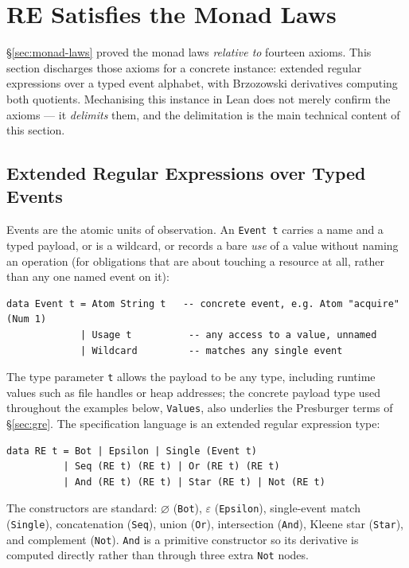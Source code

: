 \documentclass[acmsmall,screen]{acmart}
\begin{document}
\section{RE Satisfies the Monad Laws}
\label{sec:re-instance}

\S\ref{sec:monad-laws} proved the monad laws \emph{relative to} fourteen
axioms.
This section discharges those axioms for a concrete instance: extended
regular expressions over a typed event alphabet, with Brzozowski
derivatives computing both quotients.
Mechanising this instance in Lean does not merely confirm the axioms ---
it \emph{delimits} them, and the delimitation is the main technical content
of this section.

\subsection{Extended Regular Expressions over Typed Events}
\label{sec:re}

Events are the atomic units of observation.
An \lstinline{Event t} carries a name and a typed payload, or is a
wildcard, or records a bare \emph{use} of a value without naming an
operation (for obligations that are about touching a resource at all,
rather than any one named event on it):
\begin{lstlisting}
data Event t = Atom String t   -- concrete event, e.g. Atom "acquire" (Num 1)
             | Usage t          -- any access to a value, unnamed
             | Wildcard         -- matches any single event
\end{lstlisting}
The type parameter \lstinline{t} allows the payload to be any type,
including runtime values such as file handles or heap addresses; the
concrete payload type used throughout the examples below, \lstinline{Values},
also underlies the Presburger terms of \S\ref{sec:gre}.
The specification language is an extended regular expression type:
\begin{lstlisting}
data RE t = Bot | Epsilon | Single (Event t)
          | Seq (RE t) (RE t) | Or (RE t) (RE t)
          | And (RE t) (RE t) | Star (RE t) | Not (RE t)
\end{lstlisting}
The constructors are standard: $\varnothing$ (\lstinline{Bot}),
$\varepsilon$ (\lstinline{Epsilon}), single-event match
(\lstinline{Single}), concatenation (\lstinline{Seq}), union
(\lstinline{Or}), intersection (\lstinline{And}), Kleene star
(\lstinline{Star}), and complement (\lstinline{Not}).
\lstinline{And} is a primitive constructor so its derivative is computed
directly rather than through three extra \lstinline{Not} nodes.
\end{document}
